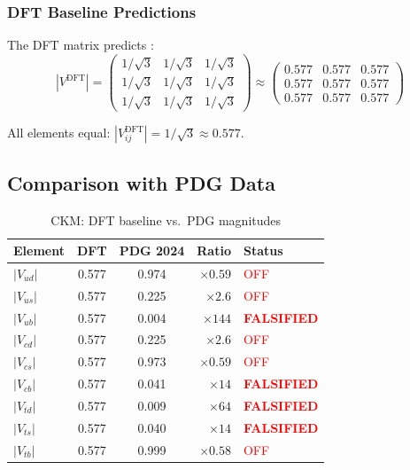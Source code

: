 \subsubsection{DFT Baseline Predictions}

The DFT matrix predicts \tagDc{}:
\begin{equation}
    |V^{\text{DFT}}| =
    \begin{pmatrix}
        1/\sqrt{3} & 1/\sqrt{3} & 1/\sqrt{3} \\
        1/\sqrt{3} & 1/\sqrt{3} & 1/\sqrt{3} \\
        1/\sqrt{3} & 1/\sqrt{3} & 1/\sqrt{3}
    \end{pmatrix}
    \approx
    \begin{pmatrix}
        0.577 & 0.577 & 0.577 \\
        0.577 & 0.577 & 0.577 \\
        0.577 & 0.577 & 0.577
    \end{pmatrix}
    \label{eq:ch7_dft_numeric}
\end{equation}

All elements equal: $|V_{ij}^{\text{DFT}}| = 1/\sqrt{3} \approx 0.577$.

\subsection{Comparison with PDG Data}
\label{sec:ch7_comparison}

\begin{table}[ht]
\centering
\caption{CKM: DFT baseline vs.\ PDG magnitudes}
\label{tab:ch7_ckm_comparison}
\begin{tabular}{lccrl}
\toprule
\textbf{Element} & \textbf{DFT} & \textbf{PDG 2024} \tagBL{} & \textbf{Ratio} & \textbf{Status} \\
\midrule
$|V_{ud}|$ & 0.577 & 0.974 & $\times 0.59$ & \textcolor{red}{OFF} \\
$|V_{us}|$ & 0.577 & 0.225 & $\times 2.6$ & \textcolor{red}{OFF} \\
$|V_{ub}|$ & 0.577 & 0.004 & $\times 144$ & \textcolor{red}{\textbf{FALSIFIED}} \\
$|V_{cd}|$ & 0.577 & 0.225 & $\times 2.6$ & \textcolor{red}{OFF} \\
$|V_{cs}|$ & 0.577 & 0.973 & $\times 0.59$ & \textcolor{red}{OFF} \\
$|V_{cb}|$ & 0.577 & 0.041 & $\times 14$ & \textcolor{red}{\textbf{FALSIFIED}} \\
$|V_{td}|$ & 0.577 & 0.009 & $\times 64$ & \textcolor{red}{\textbf{FALSIFIED}} \\
$|V_{ts}|$ & 0.577 & 0.040 & $\times 14$ & \textcolor{red}{\textbf{FALSIFIED}} \\
$|V_{tb}|$ & 0.577 & 0.999 & $\times 0.58$ & \textcolor{red}{OFF} \\
\bottomrule
\end{tabular}
\end{table}

